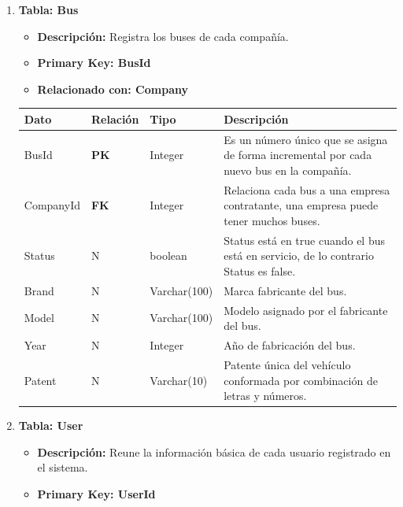 \documentclass[12pt]{article}
\begin{document}
\begin{enumerate}
    \newpage
    \item \textbf{Tabla: Bus}
    \begin{itemize}
        \item \textbf{Descripción:} Registra los buses de cada compañía.
        \item \textbf{Primary Key: BusId}
        \item \textbf{Relacionado con: Company}
    \end{itemize}
    \begin{table}[!h]
        \centering
        \begin{tabular}{|p{3cm}|p{2cm}|p{2.5cm}|p{8cm}|}
             \hline
             \textbf{Dato} & \textbf{Relación} & \textbf{Tipo} & \textbf{Descripción} \\
             \hline
             BusId & \textbf{PK} & Integer & Es un número único que se asigna de forma incremental por cada nuevo bus en la compañía. \\
             \hline
             CompanyId & \textbf{FK} & Integer & Relaciona cada bus a una empresa contratante, una empresa puede tener muchos buses. \\
             \hline
             Status & N & boolean & Status está en true cuando el bus está en servicio, de lo contrario Status es false. \\
             \hline
             Brand & N & Varchar(100) & Marca fabricante del bus. \\
             \hline
             Model & N & Varchar(100) & Modelo asignado por el fabricante del bus. \\
             \hline
             Year & N & Integer & Año de fabricación del bus. \\
             \hline
             Patent & N & Varchar(10) & Patente única del vehículo conformada por combinación de letras y números. \\
             \hline
        \end{tabular}
    \end{table}
    \item \textbf{Tabla: User}
    \begin{itemize}
        \item \textbf{Descripción:} Reune la información básica de cada usuario registrado en el sistema.
        \item \textbf{Primary Key: UserId}
    \end{itemize}
    \begin{table}[!h]
        \centering

\end{table}
\end{enumerate}
\end{document}
